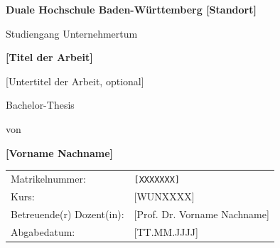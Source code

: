 \documentclass[11pt,a4paper,oneside]{book}
\begin{document}
\frontmatter
\pagestyle{empty}

\begin{titlepage}
    \centering
    \vspace*{2cm}

    {\Large\bfseries Duale Hochschule Baden-Württemberg [Standort]\par}  %
    {\large Studiengang Unternehmertum\par}                              %
    \vspace{2cm}

    {\Huge\bfseries [Titel der Arbeit]\par}                       %
    \vspace{0.5cm}
    {\Large [Untertitel der Arbeit, optional]\par}                %
    \vspace{2cm}

    {\large Bachelor-Thesis\par}
    \vspace{1cm}

    {\large von\par}
    {\Large\bfseries [Vorname Nachname]\par}                      %

    \vfill

    \begin{tabular}{ll}
        Matrikelnummer:           & \texttt{[XXXXXXX]} \\          %
        Kurs:                     & [WUNXXXX] \\                   %
        Betreuende(r) Dozent(in): & [Prof. Dr. Vorname Nachname] \\ %
        Abgabedatum:              & [TT.MM.JJJJ] \\                %
    \end{tabular}
\end{titlepage}

\cleardoublepage
\pagestyle{fancy}
\end{document}
